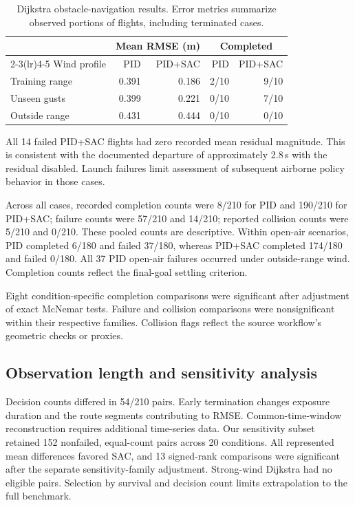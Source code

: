 \documentclass[11pt,a4paper]{article}
\begin{document}
\begin{table}[htbp]
\centering\small
\begin{tabular}{lrrrr}
\toprule
& \multicolumn{2}{c}{Mean RMSE (m)} & \multicolumn{2}{c}{Completed} \\
\cmidrule(lr){2-3}\cmidrule(lr){4-5}
Wind profile & PID & PID+SAC & PID & PID+SAC \\
\midrule
Training range & 0.391 & 0.186 & 2/10 & 9/10 \\
Unseen gusts & 0.399 & 0.221 & 0/10 & 7/10 \\
Outside range & 0.431 & 0.444 & 0/10 & 0/10 \\
\bottomrule
\end{tabular}
\caption{Dijkstra obstacle-navigation results. Error metrics summarize observed portions of flights, including terminated cases.}
\label{tab:nav}
\end{table}

All 14 failed PID+SAC flights had zero recorded mean residual magnitude. This is consistent with the documented departure of approximately 2.8\,s with the residual disabled. Launch failures limit assessment of subsequent airborne policy behavior in those cases.

Across all cases, recorded completion counts were 8/210 for PID and 190/210 for PID+SAC; failure counts were 57/210 and 14/210; reported collision counts were 5/210 and 0/210. These pooled counts are descriptive. Within open-air scenarios, PID completed 6/180 and failed 37/180, whereas PID+SAC completed 174/180 and failed 0/180. All 37 PID open-air failures occurred under outside-range wind. Completion counts reflect the final-goal settling criterion.

Eight condition-specific completion comparisons were significant after adjustment of exact McNemar tests. Failure and collision comparisons were nonsignificant within their respective families. Collision flags reflect the source workflow's geometric checks or proxies.

\subsection{Observation length and sensitivity analysis}
Decision counts differed in 54/210 pairs. Early termination changes exposure duration and the route segments contributing to RMSE. Common-time-window reconstruction requires additional time-series data. Our sensitivity subset retained 152 nonfailed, equal-count pairs across 20 conditions. All represented mean differences favored SAC, and 13 signed-rank comparisons were significant after the separate sensitivity-family adjustment. Strong-wind Dijkstra had no eligible pairs. Selection by survival and decision count limits extrapolation to the full benchmark.
\end{document}
